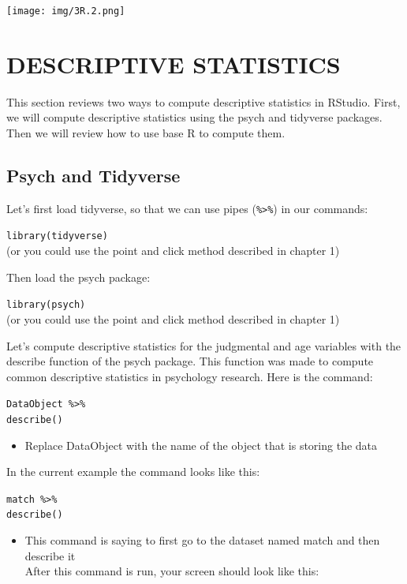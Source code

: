 \documentclass[
]{book}
\providecommand{\tightlist}{%
  \setlength{\itemsep}{0pt}\setlength{\parskip}{0pt}}
\begin{document}
\texttt{[image: img/3R.2.png]}

\hypertarget{descriptive-statistics-1}{%
\section{DESCRIPTIVE STATISTICS}\label{descriptive-statistics-1}}

This section reviews two ways to compute descriptive statistics in RStudio. First, we will compute descriptive statistics using the psych and tidyverse packages. Then we will review how to use base R to compute them.

\hypertarget{psych-and-tidyverse}{%
\subsection{Psych and Tidyverse}\label{psych-and-tidyverse}}

Let's first load tidyverse, so that we can use pipes (\texttt{\%\textgreater{}\%}) in our commands:

\texttt{library(tidyverse)}\\
(or you could use the point and click method described in chapter 1)

Then load the psych package:

\texttt{library(psych)}\\
(or you could use the point and click method described in chapter 1)

Let's compute descriptive statistics for the judgmental and age variables with the describe function of the psych package. This function was made to compute common descriptive statistics in psychology research. Here is the command:

\texttt{DataObject\ \%\textgreater{}\%}\\
\texttt{describe()}

\begin{itemize}
\tightlist
\item
  Replace DataObject with the name of the object that is storing the data
\end{itemize}

In the current example the command looks like this:

\texttt{match\ \%\textgreater{}\%}\\
\texttt{describe()}

\begin{itemize}
\tightlist
\item
  This command is saying to first go to the dataset named match and then describe it\\
  After this command is run, your screen should look like this:
\end{itemize}
\end{document}
